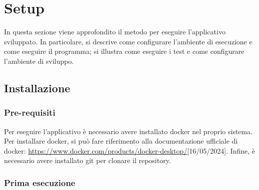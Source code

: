 \section{Setup}

In questa sezione viene approfondito il metodo per eseguire l'applicativo
sviluppato. In particolare, si descrive come configurare l'ambiente di
esecuzione e come eseguire il programma; si illustra come eseguire i test e come
configurare l'ambiente di sviluppo.

\subsection{Installazione}

\subsubsection{Pre-requisiti}

Per eseguire l'applicativo è necessario avere installato docker nel proprio
sistema. Per installare docker, si può fare riferimento alla documentazione
ufficiale di docker:
\url{https://www.docker.com/products/docker-desktop/}[16/05/2024].
Infine, è necessario avere installato git per clonare il repository.

\subsubsection{Prima esecuzione}

